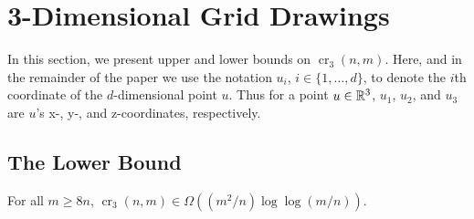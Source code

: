 \documentclass{patmorin}
\DeclareMathOperator{\crs}{cr}
\begin{document}
\section{3-Dimensional Grid Drawings}

In this section, we present upper and lower bounds on $\crs_3(n,m)$.
Here, and in the remainder of the paper we use the notation
$u_i$, $i\in\{1,\ldots,d\}$, to denote the $i$th coordinate of the
$d$-dimensional point $u$.  Thus for a point $u\in\mathbb{R}^3$, $u_1$, $u_2$,
and $u_3$ are $u$'s x-, y-, and z-coordinates, respectively.

\subsection{The Lower Bound}

\begin{thm}
  For all $m\ge 8n$, $\crs_3(n,m) \in \Omega((m^2/n)\log\log (m/n))$.
\end{thm}
\end{document}
